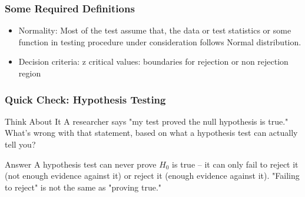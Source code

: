 

\begin{frame}[fragile]\frametitle{Some Required Definitions}
\begin{itemize}
\item Normality: Most of the test assume that, the data or test statistics 
or some function in testing procedure under consideration follows 
Normal distribution. 
 
\item Decision  criteria: z critical values:  boundaries for rejection or non rejection region
\end{itemize}
\end{frame}

\begin{frame}[fragile]\frametitle{Quick Check: Hypothesis Testing}
\begin{block}{Think About It}
A researcher says "my test proved the null hypothesis is true." What's wrong with that statement, based on what a hypothesis test can actually tell you?
\end{block}
\pause
\begin{block}{Answer}
A hypothesis test can never prove $H_0$ is true -- it can only fail to reject it (not enough evidence against it) or reject it (enough evidence against it). "Failing to reject" is not the same as "proving true."
\end{block}
\end{frame}
